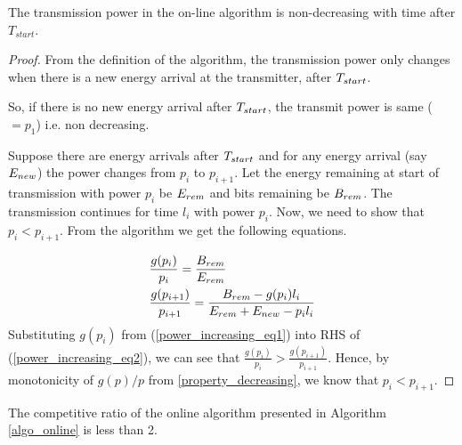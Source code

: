 \begin{lemma}
The transmission power in the on-line algorithm is non-decreasing with time after $T_{start}$.
\label{online_power}
\end{lemma}
\begin{proof}
From the definition of the algorithm, the transmission power only changes when there is a new energy arrival at the transmitter, after $T_{\mbox{\scriptsize{start}}}$. 

So, if there is no new energy arrival after $T_{\mbox{\scriptsize{start}}}$, the transmit power is same ($=p_1$) i.e. non decreasing. 

Suppose there are energy arrivals after $T_{\mbox{\scriptsize{start}}}$ and for any energy arrival (say $E_{\mbox{\scriptsize{new}}}$) the power changes from $p_i$ to $p_{i+1}$. Let the energy remaining at start of transmission with power $p_i$ be $E_{\mbox{\scriptsize{rem}}}$ and bits remaining be $B_{\mbox{\scriptsize{rem}}}$. The transmission continues for time $l_i$ with power $p_i$. Now, we need to show that $p_i<p_{i+1}$. From the algorithm we get the following equations.  

\begin{align}
&\frac{g(p_i)}{p_i}=\frac{B_{\mbox{\scriptsize{rem}}}}{E_{\mbox{\scriptsize{rem}}}} \label{power_increasing_eq1}
\\
&\frac{g(p_{i+1})}{p_{i+1}}=\frac{B_{\mbox{\scriptsize{rem}}}-g(p_i) l_i}{E_{\mbox{\scriptsize{rem}}}+E_{\mbox{\scriptsize{new}}}-p_i l_i}\label{power_increasing_eq2}
\end{align}
Substituting $g(p_i)$ from (\ref{power_increasing_eq1}) into RHS of (\ref{power_increasing_eq2}), we can see that $\frac{g(p_i)}{p_i}>\frac{g(p_{i+1})}{p_{i+1}}$. Hence, by monotonicity of $g(p)/p$ from \eqref{property_decreasing}, we know that $p_i<p_{i+1}$.
\end{proof}
\begin{theorem}
The competitive ratio of the online algorithm presented in Algorithm \ref{algo_online} is less than 2.
\end{theorem}
